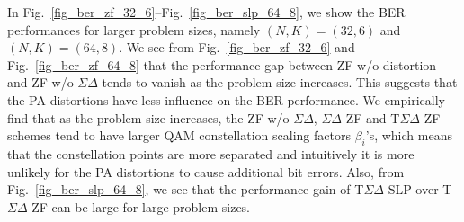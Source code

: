 \documentclass[10pt,twocolumn,twoside]{IEEEtran}
\begin{document}




In Fig.~\ref{fig_ber_zf_32_6}--Fig.~\ref{fig_ber_slp_64_8}, we show the BER performances for larger problem sizes, namely $(N,K)=(32,6)$ and $(N,K)=(64,8)$.
We see from Fig.~\ref{fig_ber_zf_32_6} and Fig.~\ref{fig_ber_zf_64_8} that the performance gap between ZF w/o distortion and ZF w/o $\Sigma \Delta$ tends to vanish as the problem size increases.
This suggests that the PA distortions have less influence on the BER performance.
We empirically find that as the problem size increases, the ZF w/o $\Sigma \Delta$, $\Sigma \Delta$ ZF and T$\Sigma \Delta$ ZF  schemes
tend to have larger QAM constellation scaling factors $\beta_i$'s, which means that the constellation points are more separated and intuitively it is more unlikely for the PA distortions to cause additional bit errors.
Also, from Fig.~\ref{fig_ber_slp_64_8}, we see that the performance gain of T$\Sigma \Delta$ SLP over T$\Sigma \Delta$ ZF can be large for large problem sizes.


\end{document}
